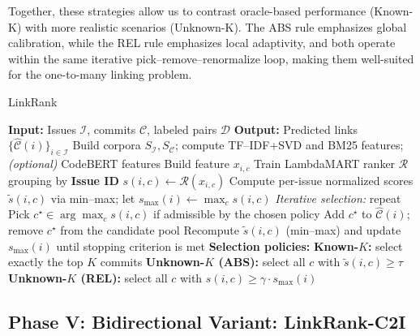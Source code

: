 Together, these strategies allow us to contrast oracle-based performance (Known-K) with more realistic scenarios (Unknown-K). The ABS rule emphasizes global calibration, while the REL rule emphasizes local adaptivity, and both operate within the same iterative pick--remove--renormalize loop, making them well-suited for the one-to-many linking problem.



\begin{algorithm}[htbp]
\caption{LinkRank }
\label{algo_1}
\begin{algorithmic}[1]
\STATE \textbf{Input:} Issues $\mathcal{I}$, commits $\mathcal{C}$, labeled pairs $\mathcal{D}$
\STATE \textbf{Output:} Predicted links $\{\widehat{\mathcal{C}}(i)\}_{i\in\mathcal{I}}$
\STATE Build corpora $S_{\mathcal{I}}, S_{\mathcal{C}}$; compute TF--IDF{+}SVD and BM25 features; \textit{(optional) }CodeBERT features
  \STATE Build feature $x_{i,c}$ 
\ENDFOR
\STATE Train LambdaMART ranker $\mathcal{R}$ grouping by \textbf{Issue ID}
    \STATE $s(i,c)\gets \mathcal{R}(x_{i,c})$
  \ENDFOR
  \STATE Compute per-issue normalized scores $\tilde{s}(i,c)$ via min--max; let $s_{\max}(i)\gets \max_{c}s(i,c)$
  \STATE \textit{Iterative selection:} repeat
  \STATE \hspace{0.6cm}Pick $c^\star \in \arg\max_{c} s(i,c)$ if admissible by the chosen policy
  \STATE \hspace{0.6cm}Add $c^\star$ to $\widehat{\mathcal{C}}(i)$; remove $c^\star$ from the candidate pool
  \STATE \hspace{0.6cm}Recompute $\tilde{s}(i,c)$ (min--max) and update $s_{\max}(i)$
  \STATE until stopping criterion is met
  \STATE \textbf{Selection policies:}
  \STATE \hspace{0.6cm}\textbf{Known-$K$:} select exactly the top $K$ commits
  \STATE \hspace{0.6cm}\textbf{Unknown-$K$ (ABS):} select all $c$ with $\tilde{s}(i,c)\ge \tau$
  \STATE \hspace{0.6cm}\textbf{Unknown-$K$ (REL):} select all $c$ with $s(i,c)\ge \gamma \cdot s_{\max}(i)$
\ENDFOR
\end{algorithmic}
\end{algorithm}


\subsection{Phase V: Bidirectional Variant: LinkRank-C2I}

